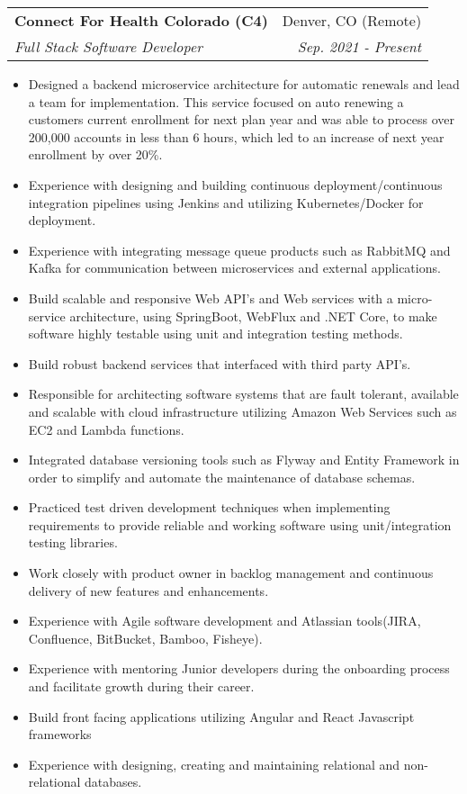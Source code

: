 \documentclass[letterpaper,11pt]{article}
\makeatletter
\newcommand{\resumeItem}[2]{
  \item\small{
    \textbf{#1}{#2 \vspace{-2pt}}
  }
}
\newcommand{\resumeSubheading}[4]{
  \vspace{-1pt}\item
    \begin{tabular*}{0.97\textwidth}[t]{l@{\extracolsep{\fill}}r}
      \textbf{#1} & #2 \\
      \textit{\small#3} & \textit{\small #4} \\
    \end{tabular*}\vspace{-5pt}
}
\newcommand{\resumeItemListStart}{\begin{itemize}}
\newcommand{\resumeItemListEnd}{\end{itemize}\vspace{-5pt}}
\makeatother
\begin{document}
    \resumeSubheading
      {Connect For Health Colorado (C4)}{Denver, CO (Remote)}
      {Full Stack Software Developer}{Sep. 2021 - Present}
      \resumeItemListStart
        \resumeItem{}
          {Designed a backend microservice architecture for automatic renewals and lead a team for implementation. This service focused on auto renewing a customers current enrollment 
          for next plan year and was able to process over 200,000 accounts in less than 6 hours, which led to an increase of next year enrollment by over 20\%.}
        \resumeItem{}
          {Experience with designing and building continuous deployment/continuous integration pipelines using Jenkins and utilizing Kubernetes/Docker for deployment.}
        \resumeItem{}
          {Experience with integrating message queue products such as RabbitMQ and Kafka for communication between microservices and external applications.}
        \resumeItem{}
          {Build scalable and responsive Web API's and Web services with a micro-service architecture, using SpringBoot, WebFlux and .NET Core, to make software highly testable using unit and integration testing methods.}
        \resumeItem{}
          {Build robust backend services that interfaced with third party API's.}
        \resumeItem{}
          {Responsible for architecting software systems that are fault tolerant, available and scalable with cloud infrastructure utilizing Amazon Web Services such as EC2 and Lambda functions.}
        \resumeItem{}
          {Integrated database versioning tools such as Flyway and Entity Framework in order to simplify and automate the maintenance of database schemas.}
        \resumeItem{}
          {Practiced test driven development techniques when implementing requirements to provide reliable and working software using unit/integration testing libraries.}
        \resumeItem{}
          {Work closely with product owner in backlog management and continuous delivery of new features and enhancements.}
        \resumeItem{}
          {Experience with Agile software development and Atlassian tools(JIRA, Confluence, BitBucket, Bamboo, Fisheye).}
        \resumeItem{}
          {Experience with mentoring Junior developers during the onboarding process and facilitate growth during their career.}
        \resumeItem{}
          {Build front facing applications utilizing Angular and React Javascript frameworks}
        \resumeItem{}
          {Experience with designing, creating and maintaining relational and non-relational databases.}
      \resumeItemListEnd
\end{document}
